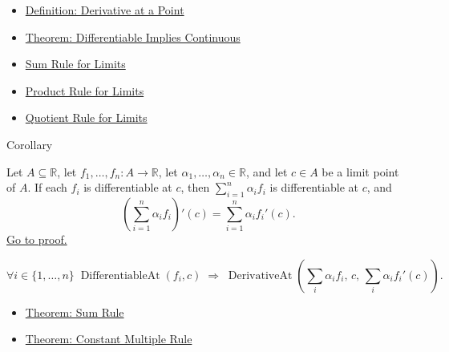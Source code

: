\begin{dependencies}
\begin{itemize}
  \item \hyperref[def:derivative-at-a-point]{Definition: Derivative at a Point}
  \item \hyperref[thm:differentiable-implies-continuous]{Theorem: Differentiable Implies Continuous}
  \item \hyperref[thm:limit-sum]{Sum Rule for Limits}
  \item \hyperref[thm:limit-product]{Product Rule for Limits}
  \item \hyperref[thm:limit-quotient]{Quotient Rule for Limits}
\end{itemize}
\end{dependencies}


\begin{corollarybox}{Corollary}
\begin{corollary}
\label{cor:finite-sum-rule}
Let $A \subseteq \mathbb{R}$, let $f_1, \dots, f_n : A \to \mathbb{R}$, let $\alpha_1, \dots, \alpha_n \in \mathbb{R}$, and let $c \in A$ be a limit point of $A$. If each $f_i$ is differentiable at $c$, then $\sum_{i=1}^{n} \alpha_i f_i$ is differentiable at $c$, and
\[
\left(\sum_{i=1}^{n} \alpha_i f_i\right)'(c) = \sum_{i=1}^{n} \alpha_i f_i'(c).
\]
\hyperref[prf:finite-sum-rule]{Go to proof.}
\end{corollary}
\end{corollarybox}

\begin{remark*}
\[
\forall i \in \{1,\dots,n\}\;\operatorname{DifferentiableAt}(f_i,c)
\;\Rightarrow\;
\operatorname{DerivativeAt}\!\left(\textstyle\sum_i \alpha_i f_i,\,c,\,\textstyle\sum_i \alpha_i f_i'(c)\right).
\]
\end{remark*}

\begin{dependencies}
\begin{itemize}
  \item \hyperref[thm:sum-rule]{Theorem: Sum Rule}
  \item \hyperref[thm:constant-multiple-rule]{Theorem: Constant Multiple Rule}
\end{itemize}
\end{dependencies}


